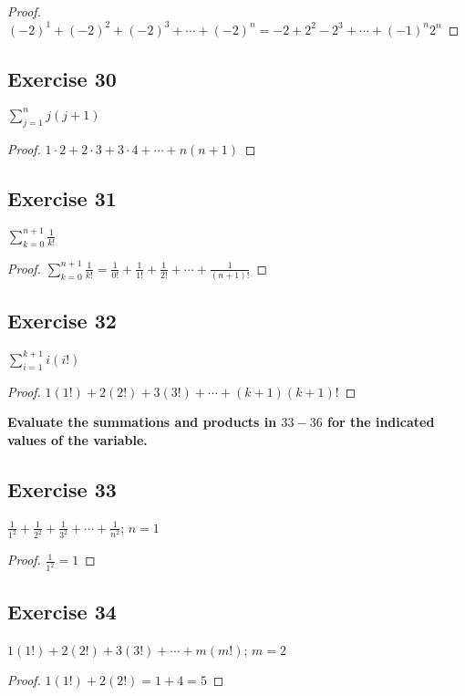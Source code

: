 \documentclass[14pt]{extarticle}
\newcommand{\dps}{\displaystyle}
\newcommand{\cy}{\color{cyan}}
\begin{document}
\begin{proof}
$(-2)^1 + (-2)^2 + (-2)^3 + \cdots + (-2)^n = -2 + 2^2 - 2^3 + \cdots + (-1)^n2^n$
\end{proof}

\subsection{Exercise 30}
$\dps\sum_{j=1}^{n}j(j+1)$

\begin{proof}
$1\cdot2 + 2\cdot3 + 3\cdot4 + \cdots + n(n+1)$
\end{proof}

\subsection{Exercise 31}
$\dps\sum_{k=0}^{n+1}\frac{1}{k!}$

\begin{proof}
$\dps\sum_{k=0}^{n+1}\frac{1}{k!} = \frac{1}{0!} + \frac{1}{1!} + \frac{1}{2!} + \cdots + \frac{1}{(n+1)!}$
\end{proof}

\subsection{Exercise 32}
$\dps\sum_{i=1}^{k+1}i(i!)$

\begin{proof}
$1(1!) + 2(2!) + 3(3!) + \cdots + (k+1)(k+1)!$
\end{proof}

{\bf\cy Evaluate the summations and products in $33-36$ for the indicated values of the variable.}

\subsection{Exercise 33}
$\dps \frac{1}{1^2} + \frac{1}{2^2} + \frac{1}{3^2} + \cdots + \frac{1}{n^2}$; $n = 1$

\begin{proof}
$\dps\frac{1}{1^2} = 1$
\end{proof}

\subsection{Exercise 34}
$\dps 1(1!) + 2(2!) + 3(3!) + \cdots + m(m!)$; $m = 2$

\begin{proof}
$\dps 1(1!) + 2(2!) = 1 + 4 = 5$
\end{proof}
\end{document}
